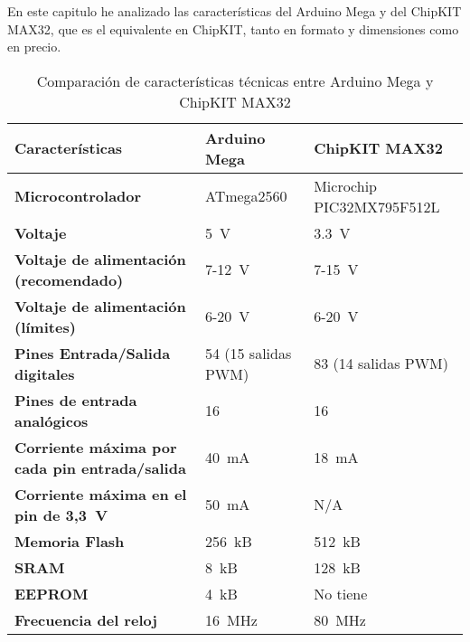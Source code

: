 



En este capitulo he analizado las características del Arduino Mega y del ChipKIT MAX32, que es el equivalente en ChipKIT, tanto en formato y dimensiones como en precio.

\begin{table}[hb]
\begin{center}
\begin{tabular}{lll}
  \textbf{Características}                                & \textbf{Arduino Mega}&\textbf{ChipKIT MAX32}\\
  \toprule
  \textbf{Microcontrolador}                               & ATmega2560          & Microchip PIC32MX795F512L\\
  \textbf{Voltaje}                                        & 5~V                 & 3.3~V\\
  \textbf{Voltaje de alimentación (recomendado)}          & 7-12~V              & 7-15~V\\
  \textbf{Voltaje de alimentación (límites)}              & 6-20~V              & 6-20~V\\
  \textbf{Pines Entrada/Salida digitales}                 & 54 (15 salidas PWM) & 83 (14 salidas PWM)\\
  \textbf{Pines de entrada analógicos}                    & 16                  & 16\\
  \textbf{Corriente máxima por cada pin entrada/salida}   & 40~mA               & 18~mA\\
  \textbf{Corriente máxima en el pin de 3,3~V}            & 50~mA               & N/A\\
  \textbf{Memoria Flash}                                  & 256~kB              & 512~kB\\
  \textbf{SRAM}                                           & 8~kB                & 128~kB\\
  \textbf{EEPROM}                                         & 4~kB                & No tiene\\
  \textbf{Frecuencia del reloj}                           & 16~MHz              & 80~MHz\\
\end{tabular}
\end{center}
\caption{Comparación de características técnicas entre Arduino Mega y ChipKIT MAX32}
\label{tab:comparacion_specs}
\end{table}

